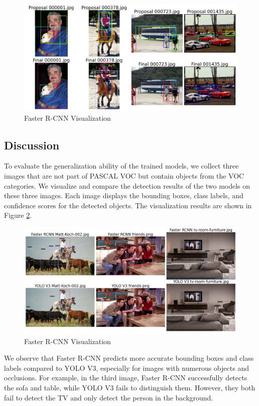 \documentclass[UTF8]{ctexart}
\begin{document}
\begin{figure}[H]
    \centering
    \includegraphics[width=1.0\textwidth]{./figs/faster-rcnn/comparison.png}
    \caption{Faster R-CNN Visualization}
    \label{fig:faster_vis}
\end{figure}


\subsection{Discussion}
To evaluate the generalization ability of the trained models, we collect three images that are not part of PASCAL VOC but contain objects from the VOC categories. 
We visualize and compare the detection results of the two models on these three images. 
Each image displays the bounding boxes, class labels, and confidence scores for the detected objects.
The visualization results are shown in Figure \ref{fig:external_vis}.

\begin{figure}[H]
    \centering
    \includegraphics[width=1.0\textwidth]{./figs/external_comparison.png}
    \caption{Faster R-CNN Visualization}
    \label{fig:external_vis}
\end{figure}

We observe that Faster R-CNN predicts more accurate bounding boxes and class labels compared to YOLO V3, especially for images with numerous objects and occlusions.
For example, in the third image, Faster R-CNN successfully detects the sofa and table, while YOLO V3 fails to distinguish them. However, they both fail to detect the TV and only detect the person in the background.
\end{document}

